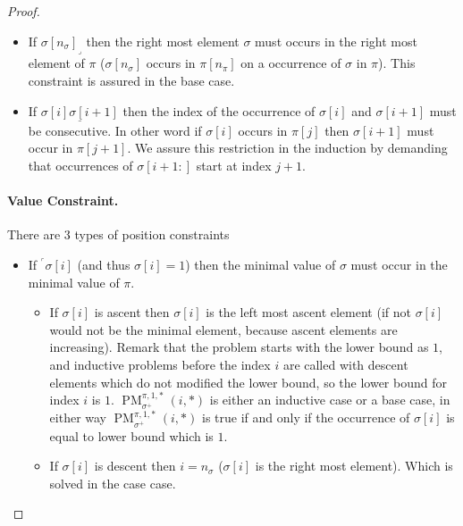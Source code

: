 \documentclass[a4paper]{llncs}
\newcommand{\ptext}{\pi}
\newcommand{\pmotif}{\sigma}
\newcommand{\pbmotif}{\pmotif^+}
\DeclareMathOperator{\PMa}{PM}
\newcommand{\PM}[6]{\PMa_{{#1}}^{{#2},{#3},{#4}}({#5},{#6})}
\begin{document}
\begin{proof}
\begin{itemize}
	\item If ${\pmotif[n_\pmotif]}_\lrcorner$ then the right most element $\sigma$ must occurs in the right most element of $\pi$ ($\pmotif[n_\pmotif]$ occurs in $\ptext[n_\ptext]$ on a occurrence of $\pmotif$ in $\ptext$). This constraint is assured in the base case.
	
	\item If $\underline{\pmotif[i]\pmotif[i+1]}$ then the index of the occurrence of $\pmotif[i]$ and $\pmotif[i+1]$ must be consecutive. In other word if $\pmotif[i]$ occurs in $\ptext[j]$ then $\pmotif[i+1]$ must occur in $\ptext[j+1]$. We assure this restriction in the induction by demanding that occurrences of $\pmotif[i+1:]$  start at index $j+1$. 
\end{itemize}

\paragraph{Value Constraint.} There are 3 types of position constraints 
\begin{itemize}
	\item If $^\ulcorner{\sigma[i]}$ (and thus $\sigma[i]=1$) then the minimal value of $\pmotif$ must occur in the minimal value of $\ptext$. 
	\begin{itemize}
		\item If $\sigma[i]$ is ascent then $\sigma[i]$ is the left most ascent element (if not $\sigma[i]$ would not be the minimal element, because ascent elements are increasing). Remark that the problem starts with the lower bound as $1$, and inductive problems before the index $i$ are called with descent elements which do not modified the lower bound, so the lower bound for index $i$ is $1$. 
		$\PM{\pbmotif}{\ptext}{1}{*}{i}{*}$ is either an inductive case or a base case, in either way  $\PM{\pbmotif}{\ptext}{1}{*}{i}{*}$ is true if and only if the occurrence of $\sigma[i]$ is equal to lower bound which is  $1$.	
				
		\item If $\sigma[i]$ is descent then $i=n_\pmotif$ ($\sigma[i]$ is the right most element). Which is solved in the case case.
	\end{itemize}
	
	
	

\end{itemize}
\end{proof}
\end{document}

